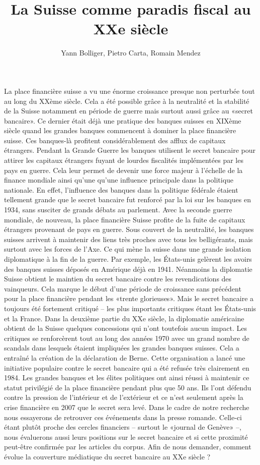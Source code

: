 \documentclass[ebook,9pt,oneside,openany]{memoir}
\title{La Suisse comme paradis fiscal au XXe siècle}
\author{Yann Bolliger, Pietro Carta, Romain Mendez}
\begin{document}
\maketitle

La place financière suisse a vu une énorme croissance presque non perturbée tout au long du XXème siècle. Cela a été possible grâce à la neutralité et la stabilité de la Suisse notamment en période de guerre mais surtout aussi grâce au «secret bancaire». Ce dernier était déjà une pratique des banques suisses en XIXème siècle quand les grandes banques commencent à dominer la place financière suisse. Ces banques-là profitent considérablement des afflux de capitaux étrangers. Pendant la Grande Guerre les banques utilisent le secret bancaire pour attirer les capitaux étrangers fuyant de lourdes fiscalités implémentées par les pays en guerre.
Cela leur permet de devenir une force majeur à l’échelle de la finance mondiale ainsi qu’une qu’une influence principale dans la politique nationale.
En effet, l’influence des banques dans la politique fédérale étaient tellement grande que le secret bancaire fut renforcé par la loi sur les banques en 1934, sans susciter de grands débats au parlement. 
Avec la seconde guerre mondiale, de nouveau, la place financière Suisse profite de la fuite de capitaux étrangers provenant de pays en guerre. Sous couvert de la neutralité, les banques suisses arrivent à maintenir des liens très proches avec tous les belligérants, mais surtout avec les forces de l’Axe. Ce qui mène la suisse dans une grande isolation diplomatique à la fin de la guerre. Par exemple, les États-unis gelèrent les avoirs des banques suisses déposés en Amérique déjà en 1941. Néanmoins la diplomatie Suisse obtient le maintien du secret bancaire contre les revendications des vainqueurs. Cela marque le début d’une période de croissance sans précédent pour la place financière pendant les «trente glorieuses».
Mais le secret bancaire a toujours été fortement critiqué – les plus importants critiques étant les États-unis et la France. Dans la deuxième partie du XXe siècle, la diplomatie américaine obtient de la Suisse quelques concessions qui n’ont toutefois aucun impact. Les critiques se renforcèrent tout au long des années 1970 avec un grand nombre de scandals dans lesquels étaient impliquées les grandes banques suisses. Cela a entraîné la création de la déclaration de Berne. Cette organisation a lancé une initiative populaire contre le secret bancaire qui a été refusée très clairement en 1984.
Les grandes banques et les élites politiques ont ainsi réussi à maintenir ce statut privilégié de la place financière pendant plus que 50 ans. Ils l’ont défendu contre la pression de l’intérieur et de l’extérieur et ce n’est seulement après la crise financière en 2007 que le secret sera levé.
Dans le cadre de notre recherche nous essayerons de retrouver ces événements dans la presse romande. Celle-ci étant plutôt proche des cercles financiers – surtout le «journal de Genève» –, nous évaluerons aussi leurs positions sur le secret bancaire et si cette proximité peut-être confirmée par les articles du corpus. Afin de nous demander, comment évolue la couverture médiatique du secret bancaire au XXe siècle ?
\end{document}
